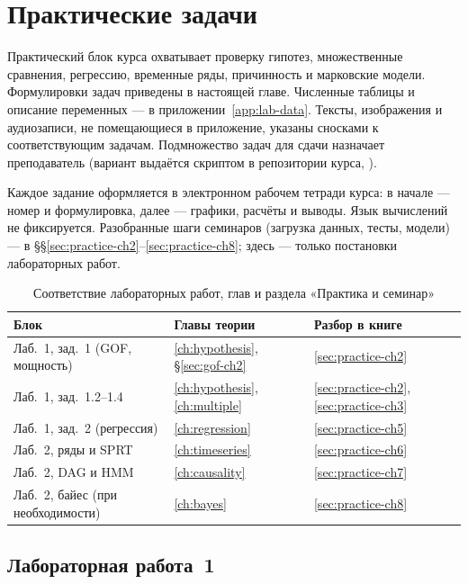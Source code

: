 \chapter{Практические задачи}
\label{ch:labs}

Практический блок курса охватывает проверку гипотез, множественные сравнения, регрессию, временные ряды, причинность и марковские модели.
Формулировки задач приведены в настоящей главе.
Численные таблицы и описание переменных --- в приложении~\ref{app:lab-data}.
Тексты, изображения и аудиозаписи, не помещающиеся в приложение, указаны сносками к соответствующим задачам.
Подмножество задач для сдачи назначает преподаватель (вариант выдаётся скриптом в репозитории курса, \PSADRepo{}).

Каждое задание оформляется в электронном рабочем тетради курса: в начале --- номер и формулировка, далее --- графики, расчёты и выводы. Язык вычислений не фиксируется.
Разобранные шаги семинаров (загрузка данных, тесты, модели) --- в \S\S\ref{sec:practice-ch2}--\ref{sec:practice-ch8}; здесь --- только постановки лабораторных работ.

\begin{table}[htbp]
\centering
\caption{Соответствие лабораторных работ, глав и раздела «Практика и семинар»}
\label{tab:lab-theory-practice}
\footnotesize
\begin{tabularx}{\linewidth}{|l|X|X|}
\hline
\textbf{Блок} & \textbf{Главы теории} & \textbf{Разбор в книге} \\
\hline
Лаб.\ 1, зад.\ 1 (GOF, мощность) & \ref{ch:hypothesis}, \S\ref{sec:gof-ch2} & \ref{sec:practice-ch2} \\
Лаб.\ 1, зад.\ 1.2--1.4 & \ref{ch:hypothesis}, \ref{ch:multiple} & \ref{sec:practice-ch2}, \ref{sec:practice-ch3} \\
Лаб.\ 1, зад.\ 2 (регрессия) & \ref{ch:regression} & \ref{sec:practice-ch5} \\
Лаб.\ 2, ряды и SPRT & \ref{ch:timeseries} & \ref{sec:practice-ch6} \\
Лаб.\ 2, DAG и HMM & \ref{ch:causality} & \ref{sec:practice-ch7} \\
Лаб.\ 2, байес (при необходимости) & \ref{ch:bayes} & \ref{sec:practice-ch8} \\
\hline
\end{tabularx}
\end{table}

\section{Лабораторная работа~1}
\label{sec:lab1-tasks}

